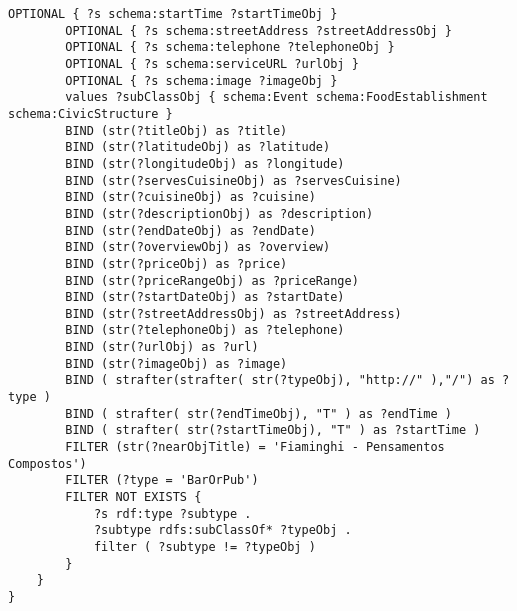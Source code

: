 \begin{lstlisting}[language=SPARQL,basicstyle=\ttfamily\small]
		OPTIONAL { ?s schema:startTime ?startTimeObj }
		OPTIONAL { ?s schema:streetAddress ?streetAddressObj }	
		OPTIONAL { ?s schema:telephone ?telephoneObj }
		OPTIONAL { ?s schema:serviceURL ?urlObj }
		OPTIONAL { ?s schema:image ?imageObj }
		values ?subClassObj { schema:Event schema:FoodEstablishment schema:CivicStructure } 
		BIND (str(?titleObj) as ?title)
		BIND (str(?latitudeObj) as ?latitude)
		BIND (str(?longitudeObj) as ?longitude)
		BIND (str(?servesCuisineObj) as ?servesCuisine)
		BIND (str(?cuisineObj) as ?cuisine)
		BIND (str(?descriptionObj) as ?description)
		BIND (str(?endDateObj) as ?endDate)
		BIND (str(?overviewObj) as ?overview)
		BIND (str(?priceObj) as ?price)
		BIND (str(?priceRangeObj) as ?priceRange)
		BIND (str(?startDateObj) as ?startDate)
		BIND (str(?streetAddressObj) as ?streetAddress)
		BIND (str(?telephoneObj) as ?telephone)
		BIND (str(?urlObj) as ?url)
		BIND (str(?imageObj) as ?image)
		BIND ( strafter(strafter( str(?typeObj), "http://" ),"/") as ?type )
		BIND ( strafter( str(?endTimeObj), "T" ) as ?endTime )
		BIND ( strafter( str(?startTimeObj), "T" ) as ?startTime )
		FILTER (str(?nearObjTitle) = 'Fiaminghi - Pensamentos Compostos')
		FILTER (?type = 'BarOrPub')
		FILTER NOT EXISTS {
			?s rdf:type ?subtype .
			?subtype rdfs:subClassOf* ?typeObj .
			filter ( ?subtype != ?typeObj )
		}
	}
}
\end{lstlisting}
